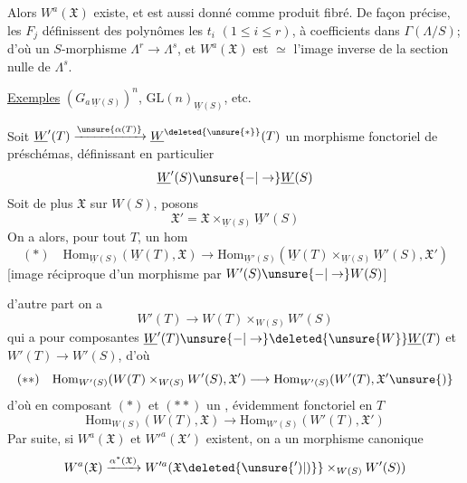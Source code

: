 Alors $W^a(\mathfrak X)$ existe, et est aussi donné comme produit fibré. De façon précise, les $F_j$  définissent des polynômes  les $t_i$ $(1\leq i\leq r)$, à coefficients dans $\Gamma(\Lambda/S)$; d'où  un $S$-morphisme $\Lambda^r\to\Lambda^s$, et $W^a(\mathfrak X)$ est $\simeq$ l'image inverse de la section nulle de $\Lambda^s$.

\uline{Exemples}  $(G_{a\,\underline W(S)})^n$, $\mathrm{GL}(n)_{\underline W(S)}$, etc.

Soit $\underline W'(T)\xrightarrow{\unsure{\alpha(T)}}\underline W^{\deleted{\unsure{*}}}(T)$ un morphisme fonctoriel de préschémas, définissant en particulier
\[
\underline W'(S)\unsure{-|\to}\underline W(S)
\]
Soit de plus $\mathfrak X$ sur $W(S)$, posons
\[
\mathfrak X'=\mathfrak X\times_{\underline W(S)}\underline W'(S)
\]
On a alors, pour tout $T$, un hom
\[
(\ast)\quad \mathrm{Hom}_{\underline W(S)}(\underline W(T),\mathfrak X)\longrightarrow
\mathrm{Hom}_{\underline W'(S)}(\underline W(T)\times_{\underline W(S)}\underline W'(S),\mathfrak X')
\]
[image réciproque d'un morphisme par $W'(S)\unsure{-|\to}W(S)$]

d'autre part on a
\[
W'(T)\longrightarrow W(T)\times_{W(S)}W'(S)
\]
 qui a pour composantes $\underline W'(T)\unsure{-|\to}\deleted{\unsure{W}}\underline W(T)$ et $W'(T)\to W'(S)$, d'où
\[
(\ast\ast)\quad\mathrm{Hom}_{W'(S)}(W(T)\times_{W(S)}W'(S),\mathfrak X')\longrightarrow
\mathrm{Hom}_{W'(S)}(W'(T),\mathfrak X'\unsure{)}
\]
d'où en composant $(\ast)$ et $(\ast\ast)$ un  , évidemment fonctoriel en $T$
\[
\mathrm{Hom}_{W(S)}(W(T),\mathfrak X)\longrightarrow\mathrm{Hom}_{W'(S)}(W'(T),\mathfrak X')
\]
Par suite, si $W^a(\mathfrak X)$ et $W'^a(\mathfrak X')$ existent, on a un morphisme canonique
\[
W^a(\mathfrak X)\xrightarrow{\alpha^*(\mathfrak X)}W'^a(\mathfrak X\deleted{\unsure{')|)}}\times_{W(S)}W'(S))
\]
